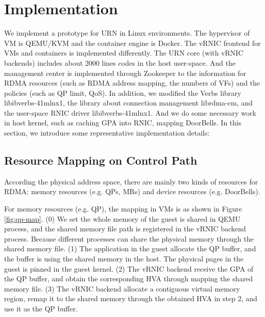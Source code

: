 \section{Implementation}
 We implement a prototype for URN in Linux environments. The hypervisor of VM is QEMU/KVM and the container engine is Docker. The vRNIC frontend for VMs and containers is implemented differently. The URN core (with vRNIC backends) includes about 2000 lines codes in the host user-space. And the management center is implemented through Zookeeper to the information for RDMA resources (such as RDMA address mapping, the numbers of VFs) and the policies (such as QP limit, QoS). In addition, we modified the Verbs library libibverbs-41mlnx1, the library about connection management librdma-cm, and the user-space RNIC driver libibverbs-41mlnx1. And we do some necessary work in host kernel, such as caching GPA into RNIC, mapping DoorBells. In this section, we introduce some representative implementation details:
 
 \subsection{Resource Mapping on Control Path}
According the physical address space, there are mainly two kinds of resources for RDMA: memory resources (e.g. QPs, MRs) and device resources (e.g. DoorBells). 
 
 For memory resources (e.g. QP), the mapping in VMs is as shown in Figure \ref{fig:qp-map}. (0) We set the whole memory of the guest is shared in QEMU process, and the shared memory file path is registered in the vRNIC backend process. Because different processes can share the physical memory through the shared memory file. (1) The application in the guest allocate the QP buffer, and the buffer is using the shared memory in the host. The physical pages in the guest is pinned in the guest kernel. (2) The vRNIC backend receive the GPA of the QP buffer, and obtain the corresponding HVA through mapping the shared memory file. (3) The vRNIC backend allocate a contiguous virtual memory region, remap it to the shared memory through the obtained HVA in step 2, and use it as the QP buffer.
 
